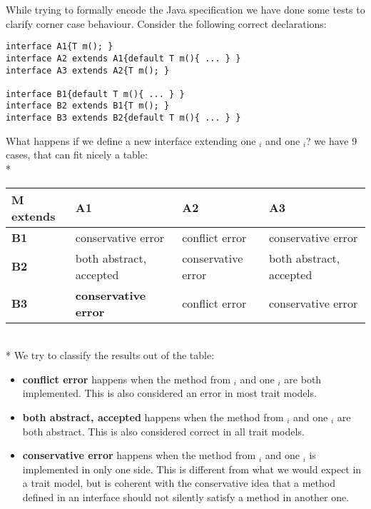 While trying to formally encode the Java specification we have done some tests to clarify corner case behaviour.
Consider the following correct declarations:
\begin{lstlisting}
interface A1{T m(); }
interface A2 extends A1{default T m(){ ... } }
interface A3 extends A2{T m(); } 

interface B1{default T m(){ ... } }
interface B2 extends B1{T m(); }
interface B3 extends B2{default T m(){ ... } }
\end{lstlisting}

What happens if we define a new interface \Q@M@ extending one \Q@A@${}_i$ and one \Q@B@${}_i$? we have 9 cases, that can fit nicely a table:\\*
\noindent
\begin{tabular}{|l|l|l|l|}
\hline
\textbf{M extends} & \textbf{A1}                  & \textbf{A2} & \textbf{A3} \\ \hline
\textbf{B1}        & conservative error                        & conflict error      & conservative error       \\ \hline
\textbf{B2}        & both abstract, accepted                        & conservative error       & both abstract, accepted       \\ \hline
\textbf{B3}        & \textbf{conservative error} &conflict  error       & conservative error      \\ \hline
\end{tabular}
\\*
We try to classify the results out of the table:
\begin{itemize}
\item \textbf{conflict error} happens when the method from \Q@A@${}_i$ and one \Q@B@${}_i$ are both implemented. This is also considered an error in most trait models.
\item \textbf{both abstract, accepted} happens when the method from \Q@A@${}_i$ and one \Q@B@${}_i$ are both abstract. This is also considered correct in all trait models.
\item \textbf{conservative error}
 happens when the method from \Q@A@${}_i$ and one \Q@B@${}_i$ is implemented in only one side.
This is different from what we would expect in a trait model, but is coherent with the conservative idea that a method defined in an interface
should not silently satisfy a method in another one.
\end{itemize}

